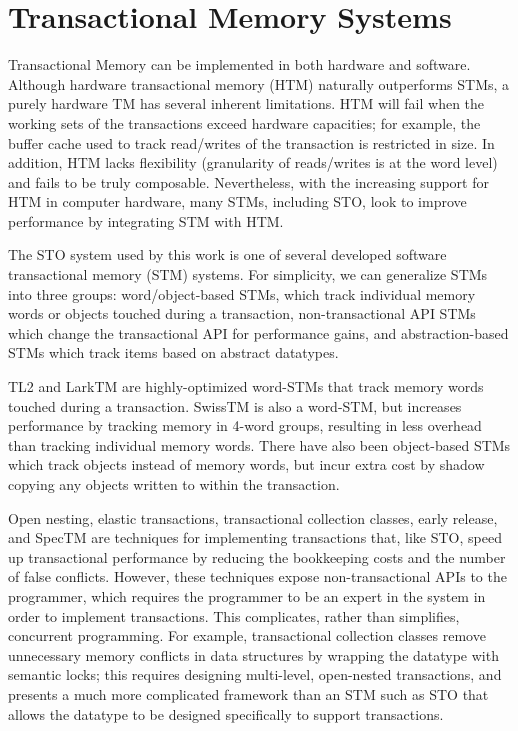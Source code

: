 \section{Transactional Memory Systems}
Transactional Memory can be implemented in both hardware and software. Although hardware transactional memory (HTM) naturally outperforms STMs, a purely hardware TM has several inherent limitations. HTM will fail when the working sets of the transactions exceed hardware capacities; for example, the buffer cache used to track read/writes of the transaction is restricted in size. In addition, HTM lacks flexibility (granularity of reads/writes is at the word level) and fails to be truly composable\cite{htm}. Nevertheless, with the increasing support for HTM in computer hardware, many STMs, including STO, look to improve performance by integrating STM with HTM.

The STO system\cite{sto} used by this work is one of several developed software transactional memory (STM) systems. For simplicity, we can generalize STMs into three groups: word/object-based STMs, which track individual memory words or objects touched during a transaction, non-transactional API STMs which change the transactional API for performance gains, and abstraction-based STMs which track items based on abstract datatypes.

TL2\cite{tl2} and LarkTM\cite{larktm} are highly-optimized word-STMs that track memory words touched during a transaction. SwissTM\cite{swisstm} is also a word-STM, but increases performance by tracking memory in 4-word groups, resulting in less overhead than tracking individual memory words. There have also been object-based STMs which track objects instead of memory words, but incur extra cost by shadow copying any objects written to within the transaction. 

Open nesting\cite{opennesting}, elastic transactions\cite{elastic}, transactional collection classes\cite{tcc}, early release\cite{earlyrelease}, and SpecTM\cite{spectm} are techniques for implementing transactions that, like STO, speed up transactional performance by reducing the bookkeeping costs and the number of false conflicts. However, these techniques expose non-transactional APIs to the programmer, which requires the programmer to be an expert in the system in order to implement transactions. This complicates, rather than simplifies, concurrent programming. For example, transactional collection classes remove unnecessary memory conflicts in data structures by wrapping the datatype with semantic locks; this requires designing multi-level, open-nested transactions, and presents a much more complicated framework than an STM such as STO that allows the datatype to be designed specifically to support transactions.

